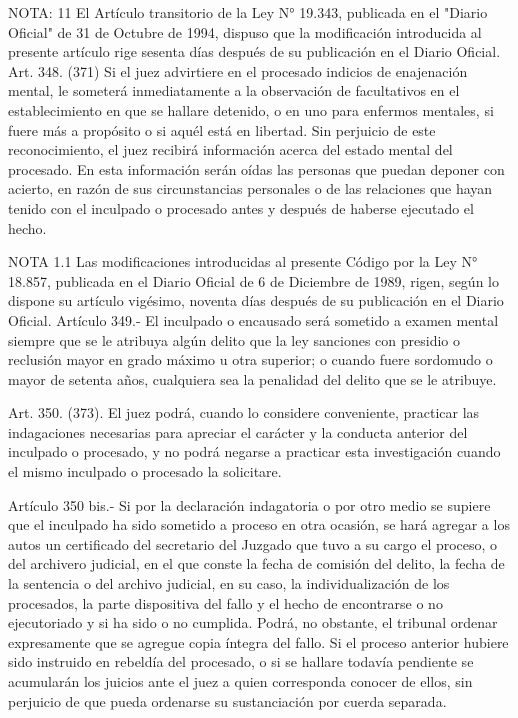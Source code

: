 NOTA:  11
    El Artículo transitorio de la Ley N° 19.343, publicada en el "Diario Oficial" de 31 de Octubre de 1994, dispuso que la modificación introducida al presente artículo rige sesenta días después de su publicación en el Diario Oficial.
    Art. 348. (371) Si el juez advirtiere en el procesado indicios de enajenación mental, le someterá inmediatamente a la observación de facultativos en el establecimiento en que se hallare detenido, o en uno para enfermos mentales, si fuere más a propósito o si aquél está en libertad.
    Sin perjuicio de este reconocimiento, el juez recibirá información acerca del estado mental del procesado. En esta información serán oídas las personas que puedan deponer con acierto, en razón de sus circunstancias personales o de las relaciones que hayan tenido con el inculpado o procesado antes y después de haberse ejecutado el hecho.







NOTA 1.1
      Las modificaciones introducidas al presente Código por la Ley N° 18.857, publicada en el Diario Oficial de 6 de Diciembre de 1989, rigen, según lo dispone su artículo vigésimo, noventa días después de su publicación en el Diario Oficial.
    Artículo 349.- El inculpado o encausado será sometido a examen mental siempre que se le atribuya algún delito que la ley sanciones con presidio o reclusión mayor en grado máximo u otra superior; o cuando fuere sordomudo o mayor de setenta años, cualquiera sea la penalidad del delito que se le atribuye.

    Art. 350. (373). El juez podrá, cuando lo considere conveniente, practicar las indagaciones necesarias para apreciar el carácter y la conducta anterior del inculpado o procesado, y no podrá negarse a practicar esta investigación cuando el mismo inculpado o procesado la solicitare.



    Artículo 350 bis.- Si por la declaración indagatoria o por otro medio se supiere que el inculpado ha sido sometido a proceso en otra ocasión, se hará agregar a los autos un certificado del secretario del Juzgado que tuvo a su cargo el proceso, o del archivero judicial, en el que conste la fecha de comisión del delito, la fecha de la sentencia o del archivo judicial, en su caso, la  individualización de los procesados, la parte dispositiva del fallo y el hecho de encontrarse o no ejecutoriado y si ha sido o no cumplida. Podrá, no obstante, el tribunal ordenar expresamente que se agregue copia íntegra del fallo.
    Si el proceso anterior hubiere sido instruido en rebeldía del procesado, o si se hallare todavía pendiente se acumularán los juicios ante el juez a quien corresponda conocer de ellos, sin perjuicio de que pueda ordenarse su sustanciación por cuerda separada.





